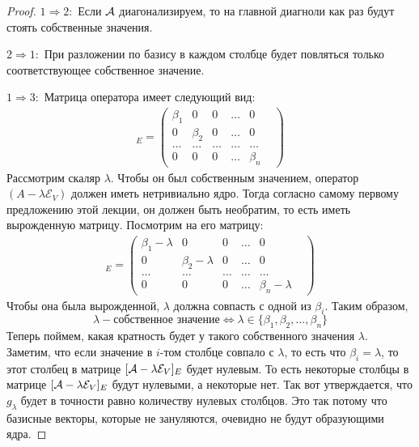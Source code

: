 \begin{proof} \quad

    \quad$1 \Rightarrow 2:$ Если $\mathcal{A}$ диагонализируем, то на главной диагноли как раз будут стоять собственные значения.
    
    \quad$2 \Rightarrow 1:$ При разложении по базису в каждом столбце будет повляться только соответствующее собственное значение.

    \quad$1 \Rightarrow 3:$ Матрица оператора имеет следующий вид:
    \begin{gather*}
        [\A]_E = \begin{pmatrix}
            \beta_1 & 0 & 0 & \dots & 0 & \\
            0 & \beta_2 & 0 & \dots & 0 & \\
            \dots & \dots & \dots & \dots & \dots \\
            0 & 0 & 0 & \dots & \beta_n
        \end{pmatrix}
    \end{gather*}
    \quad Рассмотрим скаляр $\lambda$. 
    Чтобы он был собственным значением, оператор $(A - \lambda\mathcal{E}_V)$ должен иметь нетривиально ядро. 
    Тогда согласно самому первому предложению этой лекции, он должен быть необратим, то есть иметь вырожденную матрицу.
    Посмотрим на его матрицу:
    \begin{gather*}
        [\A - \lambda\mathcal{E}_V]_E = \begin{pmatrix}
            \beta_1 - \lambda & 0 & 0 & \dots & 0 & \\
            0 & \beta_2 - \lambda & 0 & \dots & 0 & \\
            \dots & \dots & \dots & \dots & \dots \\
            0 & 0 & 0 & \dots & \beta_n - \lambda
        \end{pmatrix}
    \end{gather*}
    \quad Чтобы она была вырожденной, $\lambda$ должна совпасть с одной из $\beta_i$. 
    Таким образом, \[ \lambda - \text{собственное значение} \Leftrightarrow \lambda \in \{\beta_1, \beta_2, \dots, \beta_n \}  \]
    \quad Теперь поймем, какая кратность будет у такого собственного значения $\lambda$.
    Заметим, что если значение в $i$-том столбце совпало с $\lambda$, то есть что $\beta_i = \lambda$, то этот столбец в матрице $[\mathcal{A} - \lambda\mathcal{E}_V]_E$ будет нулевым.
    То есть некоторые столбцы в матрице $[\mathcal{A} - \lambda\mathcal{E}_V]_E$ будут нулевыми, а некоторые нет.
    Так вот утверждается, что $g_\lambda$ будет в точности равно количеству нулевых столбцов.
    Это так потому что базисные векторы, которые не зануляются, очевидно не будут образующими ядра.


\end{proof}
